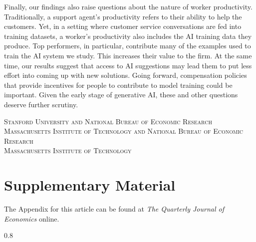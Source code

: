 \documentclass[11pt]{article}
\begin{document}

Finally, our findings also raise questions about the nature of worker productivity.  Traditionally, a support agent's productivity refers to their ability to help the customers.  Yet, in a setting where customer service conversations are fed into training datasets, a worker's productivity also includes the AI training data they produce.  Top performers, in particular, contribute many of the examples used to train the AI system we study.  This increases their value to the firm. At the same time, our results suggest that access to AI suggestions may lead them to put less effort into coming up with new solutions.  Going forward, compensation policies that provide incentives for people to contribute to model training could be important. Given the early stage of generative AI, these and other questions deserve further scrutiny.  
\vspace{10pt}

\noindent\textsc{Stanford University and National Bureau of Economic Research}\\
\textsc{Massachusetts Institute of Technology and National Bureau of Economic Research}\\
\textsc{Massachusetts Institute of Technology}
\section*{Supplementary Material}
The Appendix for this article can be found at \textit{The Quarterly Journal of Economics} online. 
\clearpage
\begin{spacing}{0.8}
%
% 

\end{spacing}



\end{document}
